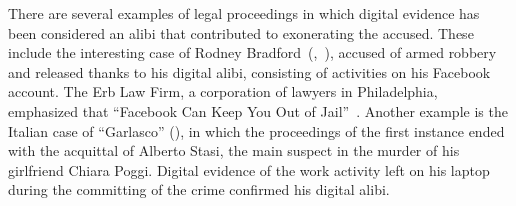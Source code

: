 \documentclass[runningheads]{llncs}
\begin{document}


There are several examples of legal proceedings in which digital evidence has been considered an alibi that contributed to exonerating the accused. These include the interesting case of Rodney Bradford~(\cite{fb_nyt},~\cite{fb_cnn}),
accused of armed robbery and released thanks to his digital alibi, consisting of activities on his Facebook account.
The Erb Law Firm, a corporation of lawyers in Philadelphia, emphasized that ``Facebook Can Keep You Out of Jail''~\cite{erb}.
Another example is the Italian case of ``Garlasco'' (\cite{garlasco0}),
in which the proceedings of the first instance ended with the acquittal of Alberto
Stasi, the main suspect in the murder of his girlfriend Chiara Poggi. Digital evidence of the work activity left on his laptop during the committing of the crime confirmed his digital alibi.

\end{document}
